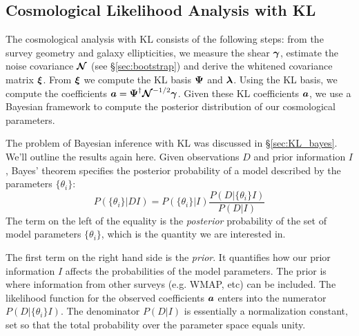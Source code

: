 \subsection{Cosmological Likelihood Analysis with KL}
The cosmological analysis with KL consists of the following steps:
from the survey geometry and galaxy ellipticities, we measure the
shear $\boldsymbol{\gamma}$, estimate the noise covariance
$\boldsymbol{\mathcal{N}}$ (see \S\ref{sec:bootstrap}) and derive
the whitened covariance matrix $\boldsymbol{\xi}$. 
From $\boldsymbol{\xi}$ we compute the KL basis $\boldsymbol{\Psi}$ and $\boldsymbol{\lambda}$.
Using the KL basis, we compute the coefficients
$\boldsymbol{a} = \boldsymbol{\Psi}^\dagger \boldsymbol{\mathcal{N}}^{-1/2} \boldsymbol{\gamma}$.
Given these KL coefficients $\boldsymbol{a}$, we use a Bayesian framework to
compute the posterior distribution of our cosmological parameters.

The problem of Bayesian inference with KL was discussed in
\S\ref{sec:KL_bayes}.  We'll outline the results again here.
Given observations $D$ and prior information $I$, Bayes' theorem specifies the
posterior probability of a model described by the parameters $\{\theta_i\}$:
\begin{equation}
  \label{eq:bayes}
  P(\{\theta_i\}|DI) = P(\{\theta_i\}|I) \frac{P(D|\{\theta_i\}I)}{P(D|I)}
\end{equation}
The term on the left of the equality
is the \textit{posterior} probability of the set of
model parameters $\{\theta_i\}$, which is the quantity we are interested in.

The first term on the right hand side
is the \textit{prior}.  It quantifies how our prior
information $I$ affects the probabilities of the model parameters.  The 
prior is where information from other surveys (e.g. WMAP, etc) can be
included. The likelihood function for the observed coefficients $\boldsymbol{a}$
enters into the numerator $P(D|\{\theta_i\}I)$.  The denominator $P(D|I)$
is essentially a normalization constant, set so that the total probability
over the parameter space equals unity.

